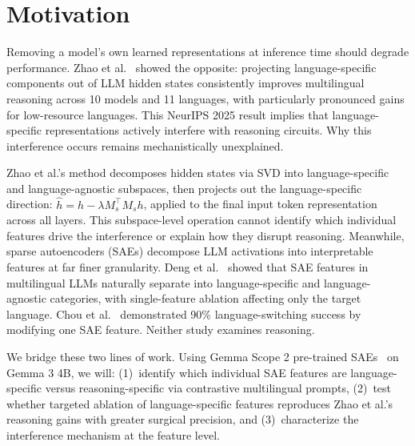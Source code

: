 \documentclass[10pt,twocolumn,a4paper]{article}
\begin{document}

\section{Motivation}

Removing a model's own learned representations at inference time should degrade performance. Zhao et al.~\cite{zhao} showed the opposite: projecting language-specific components out of LLM hidden states consistently improves multilingual reasoning across 10 models and 11 languages, with particularly pronounced gains for low-resource languages. This NeurIPS 2025 result implies that language-specific representations actively interfere with reasoning circuits. Why this interference occurs remains mechanistically unexplained.

Zhao et al.'s method decomposes hidden states via SVD into language-specific and language-agnostic subspaces, then projects out the language-specific direction: $\hat{h} = h - \lambda M_s^\top M_s h$, applied to the final input token representation across all layers. This subspace-level operation cannot identify which individual features drive the interference or explain how they disrupt reasoning. Meanwhile, sparse autoencoders (SAEs) decompose LLM activations into interpretable features at far finer granularity. Deng et al.~\cite{deng} showed that SAE features in multilingual LLMs naturally separate into language-specific and language-agnostic categories, with single-feature ablation affecting only the target language. Chou et al.~\cite{chou} demonstrated 90\% language-switching success by modifying one SAE feature. Neither study examines reasoning.

We bridge these two lines of work. Using Gemma Scope 2 pre-trained SAEs~\cite{gemmascope} on Gemma 3 4B, we will: (1)~identify which individual SAE features are language-specific versus reasoning-specific via contrastive multilingual prompts, (2)~test whether targeted ablation of language-specific features reproduces Zhao et al.'s reasoning gains with greater surgical precision, and (3)~characterize the interference mechanism at the feature level.
\end{document}
